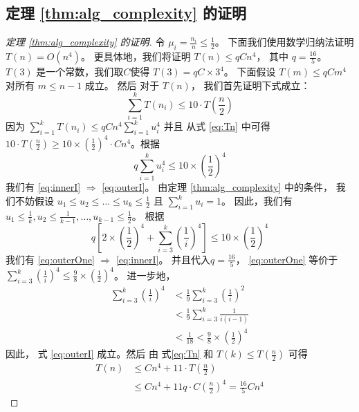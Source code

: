 \subsection{定理 \ref{thm:alg_complexity} 的证明}
\begin{proof}[定理 \ref{thm:alg_complexity} 的证明]
  令
  $\mu_i = \frac{n_i}{n} \leq \frac{1}{2}$。
  下面我们使用数学归纳法证明
  $T(n) = O(n^4)$。
  更具体地，我们将证明 
  $T(n) \leq q C n^4$， 其中 $ q = \frac{16}{5}$。
  $T(3)$ 是一个常数，我们取$C$使得 $T(3)= q C\times 3^4$。
  下面假设
	$T(m) \leq qC m^4$
  对所有 $m \leq n-1$ 成立。
  然后 对于 $T(n)$，
	我们首先证明下式成立：
	\begin{equation}\label{eq:outerI}
	\sum_{i=1}^k T(n_i) \leq 10  \cdot T \left(\frac{n}{2}\right)
	\end{equation}
	因为 $\sum_{i=1}^k T(n_i) \leq qC n^4\sum_{i=1}^k u_i^4$ 并且
  从式 \eqref{eq:Tn} 中可得
  $10 \cdot T\left(\frac{n}{2}\right) \geq 10 \times
  \left(\frac{1}{2}\right)^4 \cdot Cn^4 $。根据
	\begin{equation}\label{eq:innerI}
       q\sum_{i=1}^k u_i^4 \leq 10 \times \left(\frac{1}{2}\right)^4 
	\end{equation}
	我们有 \eqref{eq:innerI} $\Rightarrow$ \eqref{eq:outerI}。
  由定理 \ref{thm:alg_complexity} 中的条件，
  我们不妨假设
  $u_1\leq u_2 \leq \dots \leq u_k \leq \frac{1}{2}$
  且 $\sum_{i=1}^k u_i = 1$。
  因此，我们有
  $u_1 \leq \frac{1}{k}, u_2 \leq \frac{1}{k-1}, \dots, u_{k-1} \leq \frac{1}{2}$。
	根据
  \begin{equation}\label{eq:outerOne}
	 q \left[2 \times \left(\frac{1}{2}\right)^4 + \sum_{i=3}^k \left(\frac{1}{i}\right)^4\right]
   \leq 10   \times \left(\frac{1}{2}\right)^4
	\end{equation}
	我们有 \eqref{eq:outerOne} $\Rightarrow$ \eqref{eq:innerI}。
  并且代入$q=\frac{16}{5}$，
  \eqref{eq:outerOne} 等价于
	$\sum_{i=3}^k \left(\frac{1}{i} \right)^4 \leq \frac{9}{8} \times \left(\frac{1}{2}\right)^4$。
  进一步地，
	\begin{align*}
		\sum_{i=3}^k \left(\frac{1}{i} \right)^4 & < \frac{1}{9}\sum_{i=3}^k \left(\frac{1}{i}
    \right)^2 \\
		& < \frac{1}{9}\sum_{i=3}^k \frac{1}{i(i-1)} \\
		& < \frac{1}{18}
    < \frac{9}{8} \times \left(\frac{1}{2}
    \right)^4
	\end{align*}
	因此，
  式 \eqref{eq:outerI} 成立。然后
  由 式\eqref{eq:Tn} 和 $T(k) \leq T\left(\frac{n}{2}\right)$ 可得
	\begin{align}
		T(n)  & \leq Cn^4 + 11 \cdot T\left(\frac{n}{2} \right) \\
		& \leq C n^4 + 11 q \cdot  C \left(\frac{n}{2}\right)^4
    = \frac{16}{5} C n^4
	\end{align}
\end{proof}

